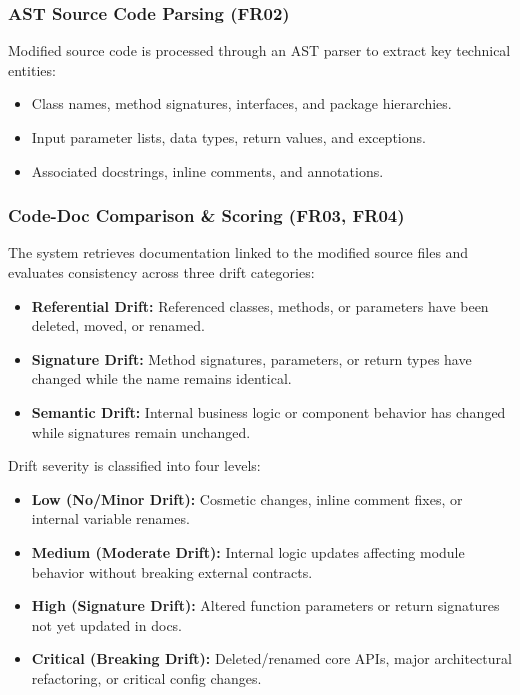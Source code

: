 \subsubsection{AST Source Code Parsing (FR02)}
Modified source code is processed through an AST parser to extract key technical entities:
\begin{itemize}
    \item Class names, method signatures, interfaces, and package hierarchies.
    \item Input parameter lists, data types, return values, and exceptions.
    \item Associated docstrings, inline comments, and annotations.
\end{itemize}

\subsubsection{Code-Doc Comparison \& Scoring (FR03, FR04)}
The system retrieves documentation linked to the modified source files and evaluates consistency across three drift categories:
\begin{itemize}
    \item \textbf{Referential Drift:} Referenced classes, methods, or parameters have been deleted, moved, or renamed.
    \item \textbf{Signature Drift:} Method signatures, parameters, or return types have changed while the name remains identical.
    \item \textbf{Semantic Drift:} Internal business logic or component behavior has changed while signatures remain unchanged.
\end{itemize}

Drift severity is classified into four levels:
\begin{itemize}
    \item \textbf{Low (No/Minor Drift):} Cosmetic changes, inline comment fixes, or internal variable renames.
    \item \textbf{Medium (Moderate Drift):} Internal logic updates affecting module behavior without breaking external contracts.
    \item \textbf{High (Signature Drift):} Altered function parameters or return signatures not yet updated in docs.
    \item \textbf{Critical (Breaking Drift):} Deleted/renamed core APIs, major architectural refactoring, or critical config changes.
\end{itemize}

